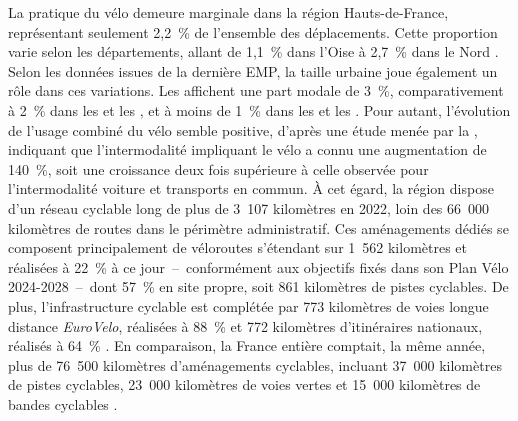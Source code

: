\begin{refsegment}
La pratique du vélo demeure marginale dans la région Hauts-de-France, représentant seulement 2,2~\% de l’ensemble des déplacements. Cette proportion varie selon les départements, allant de 1,1~\% dans l’Oise à 2,7~\% dans le Nord \textcolor{blue}{\autocite{insee_documentation_2023}}. Selon les données issues de la dernière \acrshort{EMP}, la taille urbaine joue également un rôle dans ces variations. Les  affichent une part modale de 3~\%, comparativement à 2~\% dans les  et les , et à moins de 1~\% dans les  et les  \textcolor{blue}{\autocite{velo__territoires_atlas_2023}}. Pour autant, l'évolution de l'usage combiné du vélo semble positive, d'après une étude menée par la \textcolor{blue}{\textcite[44]{region_hauts-de-france_planification_2024}}, indiquant que l'intermodalité impliquant le vélo a connu une augmentation de 140~\%, soit une croissance deux fois supérieure à celle observée pour l'intermodalité voiture et transports en commun. À cet égard, la région dispose d'un réseau cyclable long de plus de 3~107 kilomètres en 2022, loin des 66~000 kilomètres de routes dans le périmètre administratif. Ces aménagements dédiés se composent principalement de véloroutes s'étendant sur 1~562 kilomètres et réalisées à 22~\% à ce jour~–~conformément aux objectifs fixés dans son Plan Vélo 2024-2028~–~dont 57~\% en site propre, soit 861 kilomètres de pistes cyclables. De plus, l'infrastructure cyclable est complétée par 773 kilomètres de voies longue distance \textsl{EuroVelo}, réalisées à 88~\% et 772 kilomètres d'itinéraires nationaux, réalisés à 64~\% \textcolor{blue}{\autocite{velo__territoires_atlas_2023}}. En comparaison, la France entière comptait, la même année, plus de 76~500 kilomètres d'aménagements cyclables, incluant 37~000 kilomètres de pistes cyclables, 23~000 kilomètres de voies vertes et 15~000 kilomètres de bandes cyclables \textcolor{blue}{\autocite{geovelo_pistes_2024}}.%


\end{refsegment}
